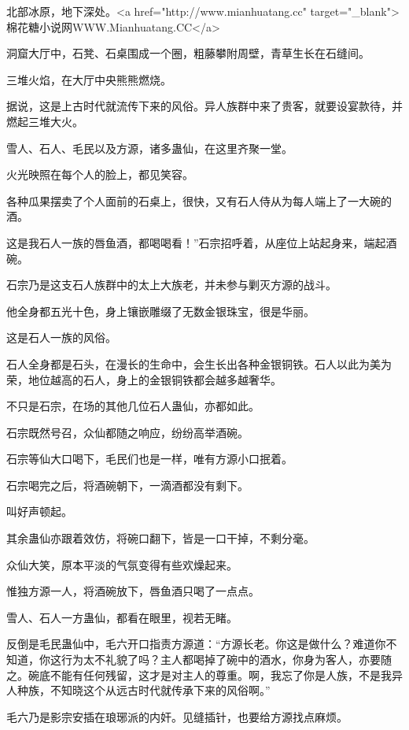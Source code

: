 
\begin{this_body}

北部冰原，地下深处。<a href="http://www.mianhuatang.cc" target="\_blank">棉花糖小说网WWW.Mianhuatang.CC</a>

洞窟大厅中，石凳、石桌围成一个圈，粗藤攀附周壁，青草生长在石缝间。

三堆火焰，在大厅中央熊熊燃烧。

据说，这是上古时代就流传下来的风俗。异人族群中来了贵客，就要设宴款待，并燃起三堆大火。

雪人、石人、毛民以及方源，诸多蛊仙，在这里齐聚一堂。

火光映照在每个人的脸上，都见笑容。

各种瓜果摆卖了个人面前的石桌上，很快，又有石人侍从为每人端上了一大碗的酒。

这是我石人一族的唇鱼酒，都喝喝看！”石宗招呼着，从座位上站起身来，端起酒碗。

石宗乃是这支石人族群中的太上大族老，并未参与剿灭方源的战斗。

他全身都五光十色，身上镶嵌雕缀了无数金银珠宝，很是华丽。

这是石人一族的风俗。

石人全身都是石头，在漫长的生命中，会生长出各种金银铜铁。石人以此为美为荣，地位越高的石人，身上的金银铜铁都会越多越奢华。

不只是石宗，在场的其他几位石人蛊仙，亦都如此。

石宗既然号召，众仙都随之响应，纷纷高举酒碗。

石宗等仙大口喝下，毛民们也是一样，唯有方源小口抿着。

石宗喝完之后，将酒碗朝下，一滴酒都没有剩下。

叫好声顿起。

其余蛊仙亦跟着效仿，将碗口翻下，皆是一口干掉，不剩分毫。

众仙大笑，原本平淡的气氛变得有些欢燥起来。

惟独方源一人，将酒碗放下，唇鱼酒只喝了一点点。

雪人、石人一方蛊仙，都看在眼里，视若无睹。

反倒是毛民蛊仙中，毛六开口指责方源道：“方源长老。你这是做什么？难道你不知道，你这行为太不礼貌了吗？主人都喝掉了碗中的酒水，你身为客人，亦要随之。碗底不能有任何残留，这才是对主人的尊重。啊，我忘了你是人族，不是我异人种族，不知晓这个从远古时代就传承下来的风俗啊。”

毛六乃是影宗安插在琅琊派的内奸。见缝插针，也要给方源找点麻烦。


\end{this_body}

